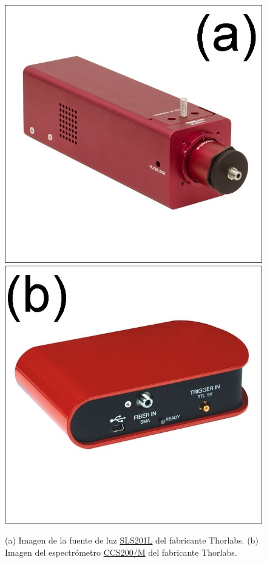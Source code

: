 \begin{figure}[H]
\hfill%
\includegraphics[scale=0.5]{Figs/microespectrometro/sls201l.jpg}
\hfill%
\includegraphics[scale=0.5]{Figs/microespectrometro/ccs200.jpg}
\hfill%
\hfill%
\caption{(a) Imagen de la fuente de luz \href{https://www.thorlabs.com/newgrouppage9.cfm?objectgroup\_id=7269\&pn=SLS201L/M}{SLS201L} del fabricante Thorlabs. (b) Imagen del espectrómetro \href{https://www.thorlabs.com/thorproduct.cfm?partnumber=CCS200/M\#ad-image-0}{CCS200/M} del fabricante Thorlabs.}
\label{fig:fuentesp}		
\end{figure}

